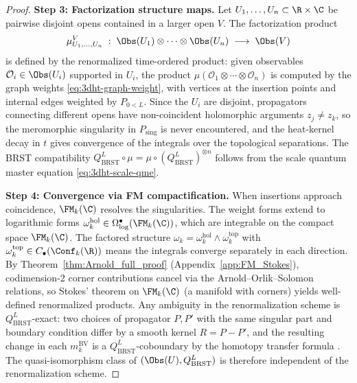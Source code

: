 \begin{proof}
\medskip\noindent\textbf{Step 3: Factorization structure maps.}
Let $U_1,\ldots,U_n \subset \R\times\C$ be pairwise disjoint opens contained in a larger open $V$. The factorization product
\[
 \mu_{U_1,\ldots,U_n}^V \;:\;
 \Obs(U_1)\otimes \cdots \otimes \Obs(U_n)
 \;\longrightarrow\;
 \Obs(V)
\]
is defined by the renormalized time-ordered product: given observables ${\mathcal O}_i\in\Obs(U_i)$ supported in $U_i$, the product $\mu({\mathcal O}_1\otimes\cdots\otimes{\mathcal O}_n)$ is computed by the graph weights \eqref{eq:3dht-graph-weight}, with vertices at the insertion points and internal edges weighted by \(P_{0<L}\). Since the $U_i$ are disjoint, propagators connecting different opens have non-coincident holomorphic arguments $z_j\ne z_k$, so the meromorphic singularity in \(P_{\mathrm{sing}}\) is never encountered, and the heat-kernel decay in \(t\) gives convergence of the integrals over the topological separations. The BRST compatibility $Q_{\mathrm{BRST}}^L\circ\mu = \mu\circ (Q_{\mathrm{BRST}}^L)^{\otimes n}$ follows from the scale quantum master equation \eqref{eq:3dht-scale-qme}.

\medskip\noindent\textbf{Step 4: Convergence via FM compactification.}
When insertions approach coincidence, $\FM_k(\C)$ resolves the singularities. The weight forms extend to logarithmic forms $\omega_k^{\mathrm{hol}}\in\Omega^\bullet_{\log}(\FM_k(\C))$, which are integrable on the compact space $\FM_k(\C)$. The factored structure $\omega_k = \omega_k^{\mathrm{hol}}\wedge\omega_k^{\mathrm{top}}$ with $\omega_k^{\mathrm{top}}\in C_\bullet(\Conf_k(\R))$ means the integrals converge separately in each direction. By Theorem~\ref{thm:Arnold_full_proof} (Appendix~\ref{app:FM_Stokes}), codimension-2 corner contributions cancel via the Arnold--Orlik--Solomon relations, so Stokes' theorem on $\FM_k(\C)$ (a manifold with corners) yields well-defined renormalized products. Any ambiguity in the renormalization scheme is \(Q_{\mathrm{BRST}}^L\)-exact: two choices of propagator \(P,P'\) with the same singular part and boundary condition differ by a smooth kernel \(R=P-P'\), and the resulting change in each \(m_k^{\mathrm{BV}}\) is a \(Q_{\mathrm{BRST}}^L\)-coboundary by the homotopy transfer formula \cite[Theorem~5.2.2.1]{CG17}. The quasi-isomorphism class of \((\Obs(U), Q_{\mathrm{BRST}}^L)\) is therefore independent of the renormalization scheme.


\end{proof}
